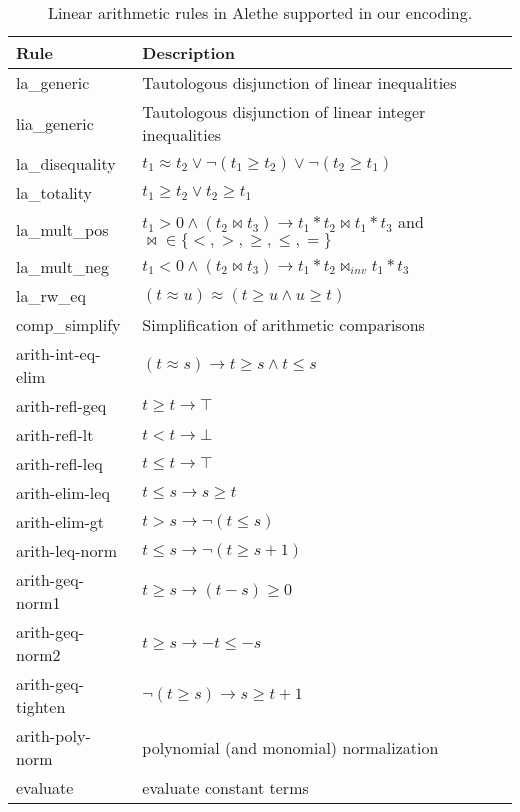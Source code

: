 \begin{table}[tp]
  \centering
  \begin{tabular}{ll}
  Rule & Description \\ \hline
  la\_generic & Tautologous disjunction of linear inequalities \\
  lia\_generic & Tautologous disjunction of linear integer inequalities \\
  la\_disequality & $t_1 \approx t_2 \lor \neg (t_1 \geq t_2) \lor \neg (t_2 \geq t_1)$ \\
  la\_totality & $t_1 \geq t_2 \lor t_2 \geq t_1$ \\
  la\_mult\_pos & $t_1 > 0 \land (t_2 \bowtie t_3) \rightarrow t_1 * t_2 \bowtie t_1 * t_3$ and $\bowtie \in \{<, >, \geq, \leq, =\}$ \\
  la\_mult\_neg & $t_1 < 0 \land (t_2 \bowtie t_3) \rightarrow t_1 * t_2 \bowtie_{inv} t_1 * t_3$ \\
  la\_rw\_eq & $(t \approx u) \approx (t \geq u \land u \geq t)$ \\
  comp\_simplify & Simplification of arithmetic comparisons \\
  arith-int-eq-elim & $(t \approx s) \rightarrow t \geq s \land t \leq s $\\
  arith-refl-geq & $t \geq t \rightarrow \top$ \\
  arith-refl-lt & $t < t \rightarrow \bot$ \\
  arith-refl-leq & $t \leq t \rightarrow \top$ \\
  arith-elim-leq & $t \leq s \rightarrow s \geq t$ \\
  arith-elim-gt & $t > s \rightarrow \neg (t \leq s)$ \\
  arith-leq-norm & $t \leq s \rightarrow \neg (t \geq s + 1)$ \\
  arith-geq-norm1 & $t \geq s \rightarrow (t - s) \geq 0$ \\
  arith-geq-norm2 & $t \geq s \rightarrow - t \leq - s$ \\
  arith-geq-tighten & $\neg (t \geq s) \rightarrow s \geq t + 1$ \\
  arith-poly-norm & polynomial (and monomial) normalization \\
  evaluate & evaluate constant terms
  \end{tabular}

  \caption{Linear arithmetic rules in Alethe supported in our encoding.}
  \label{table:linear-arith-rules}
\end{table}


